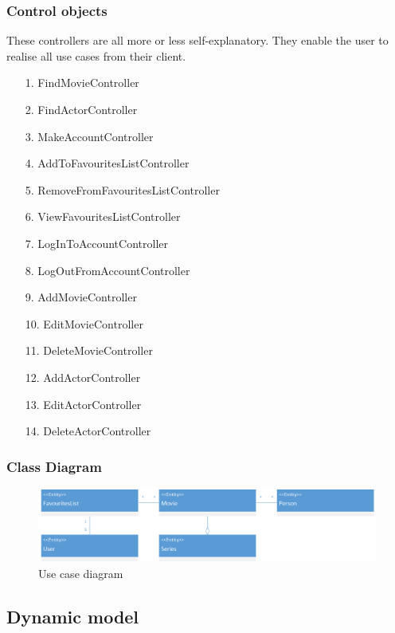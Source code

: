 \subsubsection{Control objects}

These controllers are all more or less self-explanatory. They enable the user to realise all use cases from their client.

\begin{enumerate}
	\item[1.] FindMovieController
	\item[2.] FindActorController
	\item[3.] MakeAccountController 
	\item[4.] AddToFavouritesListController
	\item[5.] RemoveFromFavouritesListController
	\item[6.] ViewFavouritesListController
	\item[7.] LogInToAccountController
	\item[8.] LogOutFromAccountController 
	
	\item[9.] AddMovieController
 	\item[10.] EditMovieController
 	\item[11.] DeleteMovieController
 	\item[12.] AddActorController
 	\item[13.] EditActorController
 	\item[14.] DeleteActorController
 	
\end{enumerate}

\subsubsection{Class Diagram}

\begin{figure}[H]
\includegraphics[width=\linewidth]{img/ClassDiagram.png}
\caption{Use case diagram}
\label{fig:use case diagram}
\end{figure}

\subsection{Dynamic model}

